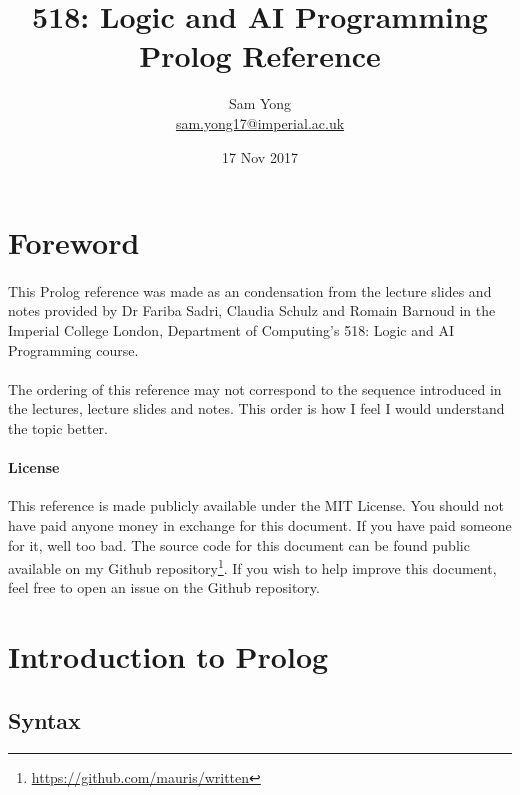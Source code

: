 \documentclass{article}
\title{
	 \large 518: Logic and AI Programming \\
	 \huge Prolog Reference
}
\date{17 Nov 2017}
\author{
	Sam Yong \\
	\small \href{mailto:sam.yong17@imperial.ac.uk}{sam.yong17@imperial.ac.uk}
}
\begin{document}
  \maketitle
  
  \begin{multicols}{2}
  
  \section*{Foreword}  
  
  \paragraph{} This Prolog reference was made as an condensation from the lecture slides and notes provided by Dr Fariba Sadri, Claudia Schulz and Romain Barnoud in the Imperial College London, Department of Computing's 518: Logic and AI Programming course.
  
  \paragraph{} The ordering of this reference may not correspond to the sequence introduced in the lectures, lecture slides and notes. This order is how I feel I would understand the topic better.
  
  \begin{footnotesize}
  \paragraph{License} This reference is made publicly available under the MIT License. You should not have paid anyone money in exchange for this document. If you have paid someone for it, well too bad. The source code for this document can be found public available on my Github repository\footnote{\href{https://github.com/mauris/written}{https://github.com/mauris/written}}. If you wish to help improve this document, feel free to open an issue on the Github repository.
  \end{footnotesize}
  
  \section{Introduction to Prolog}
  
  \subsection{Syntax}
  

\end{multicols}
\end{document}
